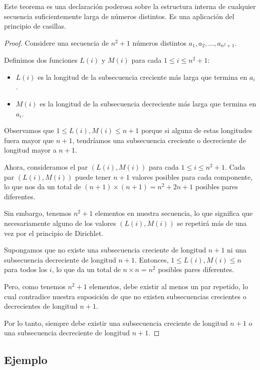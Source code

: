 \documentclass[11pt]{scrartcl}
\begin{document}
Este teorema es una declaración poderosa sobre la estructura interna de cualquier secuencia suficientemente larga de números distintos. Es una aplicación del principio de casillas.

\begin{proof}
    Considere una secuencia de \(n^2 + 1\) números distintos \(a_1, a_2, \ldots, a_{n^2+1}\).
    
    Definimos dos funciones \(L(i)\) y \(M(i)\) para cada \(1 \leq i \leq n^2 + 1\):
    \begin{itemize}
        \item \(L(i)\) es la longitud de la subsecuencia creciente más larga que termina en \(a_i\).
        \item \(M(i)\) es la longitud de la subsecuencia decreciente más larga que termina en \(a_i\).
    \end{itemize}
    
    Observamos que \(1 \leq L(i), M(i) \leq n + 1\) porque si alguna de estas longitudes fuera mayor que \(n + 1\), tendríamos una subsecuencia creciente o decreciente de longitud mayor a \(n + 1\).
    
    Ahora, consideramos el par \((L(i), M(i))\) para cada \(1 \leq i \leq n^2 + 1\). Cada par \((L(i), M(i))\) puede tener \(n + 1\) valores posibles para cada componente, lo que nos da un total de \((n + 1) \times (n + 1) = n^2 + 2n + 1\) posibles pares diferentes.
    
    Sin embargo, tenemos \(n^2 + 1\) elementos en nuestra secuencia, lo que significa que necesariamente alguno de los valores \((L(i), M(i))\) se repetirá más de una vez por el principio de Dirichlet.
    
    Supongamos que no existe una subsecuencia creciente de longitud \(n + 1\) ni una subsecuencia decreciente de longitud \(n + 1\). Entonces, \(1 \leq L(i), M(i) \leq n\) para todos los \(i\), lo que da un total de \(n \times n = n^2\) posibles pares diferentes.
    
    Pero, como tenemos \(n^2 + 1\) elementos, debe existir al menos un par repetido, lo cual contradice nuestra suposición de que no existen subsecuencias crecientes o decrecientes de longitud \(n + 1\).
    
    Por lo tanto, siempre debe existir una subsecuencia creciente de longitud \(n + 1\) o una subsecuencia decreciente de longitud \(n + 1\).
\end{proof}

\subsection*{Ejemplo}
\end{document}
